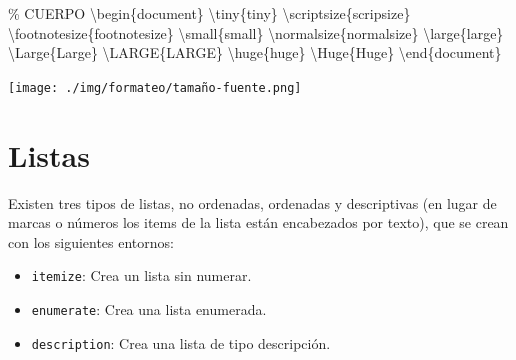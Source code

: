 \documentclass[
  a4paper,
]{scrreport}
\newenvironment{Shaded}{\begin{snugshade}}{\end{snugshade}}
\newcommand{\CommentTok}[1]{\textcolor[rgb]{0.37,0.37,0.37}{#1}}
\newcommand{\ExtensionTok}[1]{\textcolor[rgb]{0.00,0.23,0.31}{#1}}
\newcommand{\FunctionTok}[1]{\textcolor[rgb]{0.28,0.35,0.67}{#1}}
\newcommand{\KeywordTok}[1]{\textcolor[rgb]{0.00,0.23,0.31}{#1}}
\newcommand{\NormalTok}[1]{\textcolor[rgb]{0.00,0.23,0.31}{#1}}
\providecommand{\tightlist}{%
  \setlength{\itemsep}{0pt}\setlength{\parskip}{0pt}}\usepackage{longtable,booktabs,array}
\begin{document}
\begin{Shaded}
\begin{Highlighting}[]
\CommentTok{\% CUERPO}
\KeywordTok{\textbackslash{}begin}\NormalTok{\{}\ExtensionTok{document}\NormalTok{\}}
\FunctionTok{\textbackslash{}tiny}\NormalTok{\{tiny\}}
\FunctionTok{\textbackslash{}scriptsize}\NormalTok{\{scripsize\} }
\FunctionTok{\textbackslash{}footnotesize}\NormalTok{\{footnotesize\}}
\FunctionTok{\textbackslash{}small}\NormalTok{\{small\}}
\FunctionTok{\textbackslash{}normalsize}\NormalTok{\{normalsize\}}
\FunctionTok{\textbackslash{}large}\NormalTok{\{large\} }
\FunctionTok{\textbackslash{}Large}\NormalTok{\{Large\}}
\FunctionTok{\textbackslash{}LARGE}\NormalTok{\{LARGE\}}
\FunctionTok{\textbackslash{}huge}\NormalTok{\{huge\}}
\FunctionTok{\textbackslash{}Huge}\NormalTok{\{Huge\}}
\KeywordTok{\textbackslash{}end}\NormalTok{\{}\ExtensionTok{document}\NormalTok{\}}
\end{Highlighting}
\end{Shaded}

\begin{tcolorbox}[enhanced jigsaw, bottomrule=.15mm, leftrule=.75mm, opacityback=0, titlerule=0mm, bottomtitle=1mm, colbacktitle=quarto-callout-note-color!10!white, arc=.35mm, toprule=.15mm, colframe=quarto-callout-note-color-frame, title={Salida}, coltitle=black, colback=white, breakable, toptitle=1mm, rightrule=.15mm, left=2mm, opacitybacktitle=0.6]

\texttt{[image: ./img/formateo/tamaño-fuente.png]}

\end{tcolorbox}


\hypertarget{listas}{%
\chapter{Listas}\label{listas}}

Existen tres tipos de listas, no ordenadas, ordenadas y descriptivas (en
lugar de marcas o números los items de la lista están encabezados por
texto), que se crean con los siguientes entornos:

\begin{itemize}
\tightlist
\item
  \texttt{itemize}: Crea un lista sin numerar.
\item
  \texttt{enumerate}: Crea una lista enumerada.
\item
  \texttt{description}: Crea una lista de tipo descripción.
\end{itemize}
\end{document}
